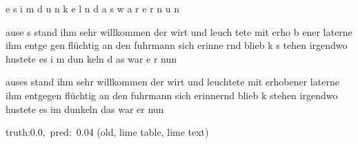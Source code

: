 \documentclass[a4paper,10pt,twoside]{article}
\begin{document}
{\color[rgb]{0.0,0,0} e}{\color[rgb]{0.0,0,0} s} {\color[rgb]{0.0,0,0} i}{\color[rgb]{0.0,0,0} m} {\color[rgb]{0.0,0,0} d}{\color[rgb]{0.0,0,0} u}{\color[rgb]{0.0,0,0} n}{\color[rgb]{0.0,0,0} k}{\color[rgb]{0.0,0,0} e}{\color[rgb]{0.0,0,0} l}{\color[rgb]{0.0,0,0} n}  {\color[rgb]{0.0,0,0} d}{\color[rgb]{0.0,0,0} a}{\color[rgb]{0.0,0,0} s} {\color[rgb]{0.0,0,0} w}{\color[rgb]{0.0,0,0} a}{\color[rgb]{0.0,0,0} r} {\color[rgb]{0.0,0,0} e}{\color[rgb]{0.0,0,0} r}  {\color[rgb]{0.0,0,0} n}{\color[rgb]{0.0,0,0} u}{\color[rgb]{0.0,0,0} n}  

{\color[rgb]{1,0,0} a}use{\color[rgb]{1,0,0} s} stand  ihm sehr {\color[rgb]{1,0,0} w}illkommen  der wirt und leuch{\color[rgb]{1,0,0} t}ete {\color[rgb]{0,0,1} m}it erho{\color[rgb]{0,0,1} b}{\color[rgb]{0,0,1} e}ner laterne ihm entge{\color[rgb]{1,0,0} g}en  flüchtig an den {\color[rgb]{1,0,0} f}uhrmann {\color[rgb]{0,0,1} s}ich erinne{\color[rgb]{0,0,1} r}nd  {\color[rgb]{0,0,1} b}lieb {\color[rgb]{0,0,1} k}  s{\color[rgb]{1,0,0} t}ehen  irgendwo hustete es i{\color[rgb]{1,0,0} m} dun{\color[rgb]{0,0,1} k}eln  d{\color[rgb]{0,0,1} a}s {\color[rgb]{0,0,1} w}ar e{\color[rgb]{0,0,1} r}  nun  

 auses stand ihm sehr willkommen der wirt und leuchtete mit erhobener laterne ihm entgegen flüchtig an {\color[rgb]{0,0,1} den} fuhrmann sich {\color[rgb]{0,0,1} erinnernd} blieb k {\color[rgb]{0,0,1} stehen} {\color[rgb]{0,0,1} irgendwo} hustete es {\color[rgb]{0,0,1} im} dunkeln das war er nun 

 {\footnotesize {\color[rgb]{0.6, 0.6, 0.6}truth:0.0,~pred:~0.04}} (old, lime table, lime text)\hrulefill
\end{document}
